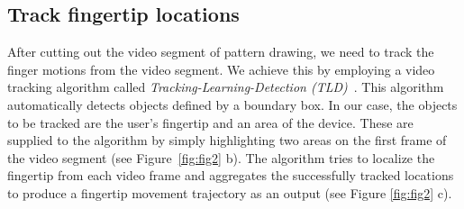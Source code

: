 
\vspace{-3mm}
\subsection{Track fingertip locations}
\label{section:tld}

        After cutting out the video segment of pattern drawing, we need to track the finger motions from the video segment. We achieve this by employing a video tracking algorithm called
        \emph{Tracking-Learning-Detection (TLD)}~\cite{kalal2012tracking}. This
        algorithm automatically detects objects defined by a boundary box. In
        our case, the objects to be tracked are the user's fingertip and an area of the device.
        These are supplied to the algorithm by simply highlighting two areas on the first frame of the video segment (see Figure~\ref{fig:fig2} b). The
        algorithm tries to localize the fingertip from each video frame and aggregates the successfully tracked locations to produce a fingertip movement trajectory as an output (see Figure
        \ref{fig:fig2} c).

